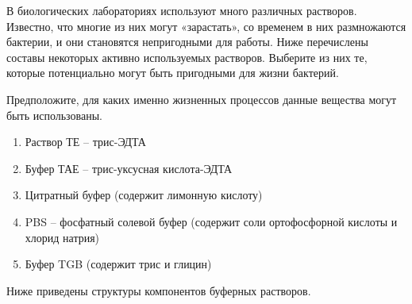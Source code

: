 
В биологических лабораториях используют много различных растворов. Известно, что многие из них могут «зарастать», со временем в них размножаются бактерии, и они становятся непригодными для работы. Ниже перечислены составы некоторых активно используемых растворов. Выберите из них те, которые потенциально могут быть пригодными для жизни бактерий. 

Предположите, для каких именно жизненных процессов данные вещества могут быть использованы.

\begin{enumerate}
    \item Раствор ТЕ – трис-ЭДТА
    \item Буфер ТАЕ – трис-уксусная кислота-ЭДТА
    \item Цитратный буфер (содержит лимонную кислоту)
    \item PBS – фосфатный солевой буфер (содержит соли ортофосфорной кислоты и хлорид натрия)
    \item Буфер TGB (содержит трис и глицин)
\end{enumerate}

Ниже приведены структуры компонентов буферных растворов.



